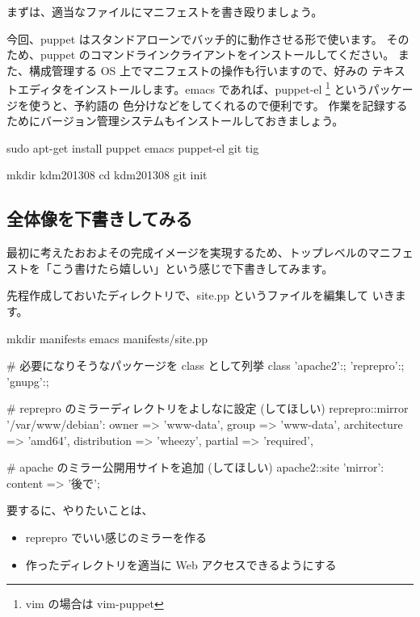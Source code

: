 \documentclass[mingoth,a4paper]{jsarticle}
\begin{document}
まずは、適当なファイルにマニフェストを書き殴りましょう。

今回、puppet はスタンドアローンでバッチ的に動作させる形で使います。
そのため、puppet のコマンドラインクライアントをインストールしてください。
また、構成管理する OS 上でマニフェストの操作も行いますので、好みの
テキストエディタをインストールします。emacs であれば、puppet-el
\footnote{vim の場合は vim-puppet} というパッケージを使うと、予約語の
色分けなどをしてくれるので便利です。
作業を記録するためにバージョン管理システムもインストールしておきましょう。

\begin{commandline}
sudo apt-get install puppet emacs puppet-el git tig

mkdir kdm201308
cd kdm201308
git init
\end{commandline}

\subsection{全体像を下書きしてみる}

最初に考えたおおよその完成イメージを実現するため、トップレベルのマニフェ
ストを「こう書けたら嬉しい」という感じで下書きしてみます。

先程作成しておいたディレクトリで、site.pp というファイルを編集して
いきます。

\begin{commandline}
mkdir manifests
emacs manifests/site.pp
\end{commandline}

\begin{commandline}
# 必要になりそうなパッケージを class として列挙
class {
  'apache2':;
  'reprepro':;
  'gnupg':;
}

# reprepro のミラーディレクトリをよしなに設定 (してほしい)
reprepro::mirror { '/var/www/debian':
  owner => 'www-data', group => 'www-data',
  architecture => 'amd64',
  distribution => 'wheezy',
  partial => 'required',
}

# apache のミラー公開用サイトを追加 (してほしい)
apache2::site {
  'mirror':
    content => '後で';
}
\end{commandline}

要するに、やりたいことは、

\begin{itemize}
\item reprepro でいい感じのミラーを作る
\item 作ったディレクトリを適当に Web アクセスできるようにする
\end{itemize}
\end{document}
